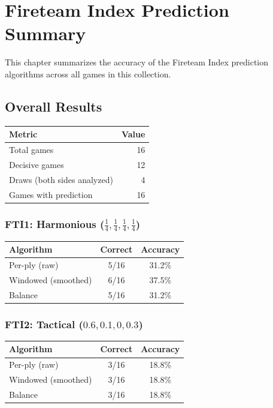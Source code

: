 \documentclass[11pt]{book}
\begin{document}
\chapter{Fireteam Index Prediction Summary}

This chapter summarizes the accuracy of the Fireteam Index prediction algorithms across all games in this collection.

\section{Overall Results}

\begin{tabular}{lr}
\toprule
\textbf{Metric} & \textbf{Value} \\
\midrule
Total games & 16 \\
Decisive games & 12 \\
Draws (both sides analyzed) & 4 \\
Games with prediction & 16 \\
\bottomrule
\end{tabular}

\subsection{FTI1: Harmonious ($\frac{1}{4}, \frac{1}{4}, \frac{1}{4}, \frac{1}{4}$)}

\begin{tabular}{lcc}
\toprule
\textbf{Algorithm} & \textbf{Correct} & \textbf{Accuracy} \\
\midrule
Per-ply (raw) & 5/16 & 31.2\% \\
Windowed (smoothed) & 6/16 & 37.5\% \\
Balance & 5/16 & 31.2\% \\
\bottomrule
\end{tabular}

\subsection{FTI2: Tactical ($0.6, 0.1, 0, 0.3$)}

\begin{tabular}{lcc}
\toprule
\textbf{Algorithm} & \textbf{Correct} & \textbf{Accuracy} \\
\midrule
Per-ply (raw) & 3/16 & 18.8\% \\
Windowed (smoothed) & 3/16 & 18.8\% \\
Balance & 3/16 & 18.8\% \\
\bottomrule
\end{tabular}
\end{document}
